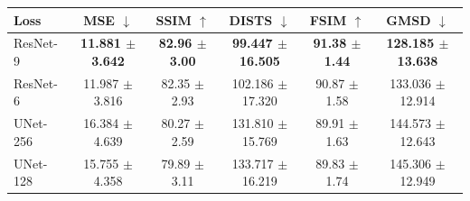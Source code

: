 \begin{tabular}{lccccc}
\hline
Loss & MSE $\downarrow$ & SSIM $\uparrow$ & DISTS $\downarrow$ & FSIM $\uparrow$ & GMSD $\downarrow$ \\
\hline
ResNet-9 & \textbf{11.881 $\pm$ 3.642} & \textbf{82.96 $\pm$ 3.00} & \textbf{99.447 $\pm$ 16.505} & \textbf{91.38 $\pm$ 1.44} & \textbf{128.185 $\pm$ 13.638} \\
ResNet-6 & 11.987 $\pm$ 3.816 & 82.35 $\pm$ 2.93 & 102.186 $\pm$ 17.320 & 90.87 $\pm$ 1.58 & 133.036 $\pm$ 12.914 \\
UNet-256 & 16.384 $\pm$ 4.639 & 80.27 $\pm$ 2.59 & 131.810 $\pm$ 15.769 & 89.91 $\pm$ 1.63 & 144.573 $\pm$ 12.643 \\
UNet-128 & 15.755 $\pm$ 4.358 & 79.89 $\pm$ 3.11 & 133.717 $\pm$ 16.219 & 89.83 $\pm$ 1.74 & 145.306 $\pm$ 12.949 \\
\hline
\end{tabular}
